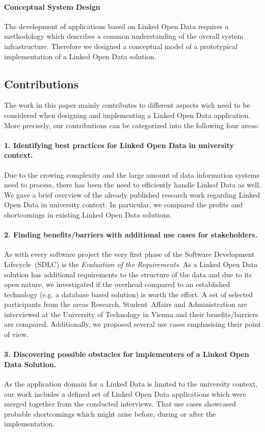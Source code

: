 \documentclass{article}
\begin{document}
\paragraph{Conceptual System Design}
The development of applications based on Linked Open Data requires a methodology which describes a common understanding of the overall system infrastructure. Therefore we designed a conceptual model of a prototypical implementation of a Linked Open Data solution. 

\subsection{Contributions}
The work in this paper mainly contributes to different aspects wich need to be considered when designing and implementing a Linked Open Data application.
More precisely, our contributions can be categorized into the following four areas:
\paragraph{1. Identifying best practices for Linked Open Data in university context.}
Due to the crowing complexity and the large amount of data information systems need to process, there has been the need to efficiently handle Linked Data as well. We gave a brief overview of the already published research work regarding Linked Open Data in university context. In particular, we compared the profits and shortcomings in existing Linked Open Data solutions. 
\paragraph{2. Finding benefits/barriers with additional use cases for stakeholders.}
As with every software project the very first phase of the Software Development Lifecycle~(SDLC) is the \textit{Evaluation of the Requirements}. As a Linked Open Data solution has additional requirements to the structure of the data and due to its open nature, we investigated if the overhead compared to an established technology (e.g. a database based solution) is worth the effort. A set of selected participants from the areas Research, Student~Affairs and Administration are interviewed at the University of Technology in Vienna and their benefits/barriers are compared. Additionally, we proposed several use cases emphasising their point of view. 
\paragraph{3. Discovering possible obstacles for implementers of a Linked Open Data Solution.}
As the application domain for a Linked Data is limited to the university context, our work includes a defined set of Linked Open Data applications which were merged together from the conducted interviews. That use cases showcased probable shortcomings which might arise before, during or after the implementation.
\end{document}
